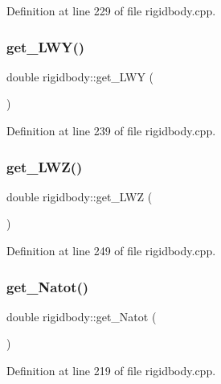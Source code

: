 Definition at line 229 of file rigidbody.\+cpp.

\mbox{\label{classrigidbody_a922325c42744a3e26fafe69e34c884ab}} 
\subsubsection{\texorpdfstring{get\+\_\+\+L\+W\+Y()}{get\_LWY()}}
{\footnotesize\ttfamily double rigidbody\+::get\+\_\+\+L\+WY (\begin{DoxyParamCaption}{ }\end{DoxyParamCaption})}



Definition at line 239 of file rigidbody.\+cpp.

\mbox{\label{classrigidbody_aa97f66b8147830cf83b2298ab8c2b286}} 
\subsubsection{\texorpdfstring{get\+\_\+\+L\+W\+Z()}{get\_LWZ()}}
{\footnotesize\ttfamily double rigidbody\+::get\+\_\+\+L\+WZ (\begin{DoxyParamCaption}{ }\end{DoxyParamCaption})}



Definition at line 249 of file rigidbody.\+cpp.

\mbox{\label{classrigidbody_afdbc4769886ebdd81947d3f9cdb5a905}} 
\subsubsection{\texorpdfstring{get\+\_\+\+Natot()}{get\_Natot()}}
{\footnotesize\ttfamily double rigidbody\+::get\+\_\+\+Natot (\begin{DoxyParamCaption}{ }\end{DoxyParamCaption})}



Definition at line 219 of file rigidbody.\+cpp.


